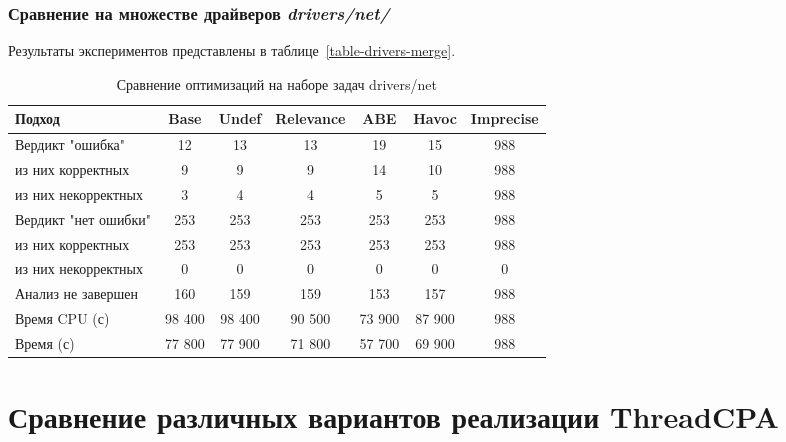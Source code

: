 \subsubsection{Сравнение на множестве драйверов \textit{drivers/net/} }

Результаты экспериментов представлены в таблице~\ref{table-drivers-merge}.

\begin{center}
  \begin{table}[h]\footnotesize
  	\label{table-drivers-opt}
    \caption{Сравнение оптимизаций на наборе задач drivers/net}
    \begin{tabular}{ | l | c | c | c | c | c | c |}
      \hline
      Подход         				& Base 		& Undef		& Relevance & ABE 		& Havoc 	& Imprecise   \\ \hline
      Вердикт "ошибка" 				& 12  		& 13   		& 13       	& 19   		& 15     	& 988      	\\ 
  \hspace{0.5cm} из них корректных 	& 9 		& 9 		& 9     	& 14   		& 10    	& 988     	\\ 
  \hspace{0.5cm} из них некорректных & 3 		& 4 		& 4     	& 5  		& 5       	& 988       \\ \hline
      Вердикт "нет ошибки"  		& 253    	& 253    	& 253     	& 253   	& 253      	& 988      	\\ 
  \hspace{0.5cm} из них корректных 	& 253 		& 253    	& 253       & 253   	& 253      	& 988     	\\
  \hspace{0.5cm} из них некорректных & 0 		& 0    		& 0      	& 0   		& 0     	& 0       \\ \hline
      Анализ не завершен       		& 160    	& 159    	& 159     	& 153   	& 157    	& 988      	\\ \hline
      Время CPU (с)   				& 98 400 	& 98 400 	& 90 500  	& 73 900   	& 87 900    & 988     	\\ 
      Время (с)  					& 77 800 	& 77 900 	& 71 800  	& 57 700   	& 69 900    & 988    	\\
      \hline
    \end{tabular}
  \end{table}
\end{center}


\section{Сравнение различных вариантов реализации ThreadCPA}

